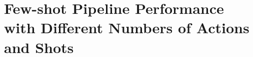 \newpage
\label{appendix:}
\section{Few-shot Pipeline Performance with Different Numbers of Actions and Shots}
